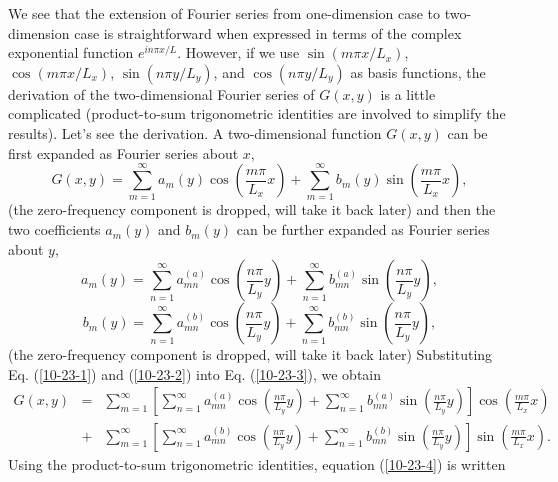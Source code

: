 \documentclass{article}
\begin{document}
We see that the extension of Fourier series from one-dimension case to
two-dimension case is straightforward when expressed in terms of the complex
exponential function $e^{i n \pi x / L}$. However, if we use $\sin (m \pi x /
L_x)$, $\cos (m \pi x / L_x)$, $\sin (n \pi y / L_y)$, and $\cos (n \pi y /
L_y)$ as basis functions, the derivation of the two-dimensional Fourier series
of $G (x, y)$ is a little complicated (product-to-sum trigonometric identities
are involved to simplify the results). Let's see the derivation. A
two-dimensional function $G (x, y)$ can be first expanded as Fourier series
about $x$,
\begin{equation}
  \label{10-23-3} G (x, y) = \sum_{m = 1}^{\infty} a_m (y) \cos \left( \frac{m
  \pi}{L_x} x \right) + \sum_{m = 1}^{\infty} b_m (y) \sin \left( \frac{m
  \pi}{L_x} x \right),
\end{equation}
(the zero-frequency component is dropped, will take it back later) and then
the two coefficients $a_m (y)$ and $b_m (y)$ can be further expanded as
Fourier series about $y$,
\begin{equation}
  \label{10-23-1} a_m (y) = \sum_{n = 1}^{\infty} a_{m n}^{(a)} \cos \left(
  \frac{n \pi}{L_y} y \right) + \sum_{n = 1}^{\infty} b_{m n}^{(a)} \sin
  \left( \frac{n \pi}{L_y} y \right),
\end{equation}
\begin{equation}
  \label{10-23-2} b_m (y) = \sum_{n = 1}^{\infty} a_{m n}^{(b)} \cos \left(
  \frac{n \pi}{L_y} y \right) + \sum_{n = 1}^{\infty} b_{m n}^{(b)} \sin
  \left( \frac{n \pi}{L_y} y \right),
\end{equation}
(the zero-frequency component is dropped, will take it back later)
Substituting Eq. (\ref{10-23-1}) and (\ref{10-23-2}) into Eq. (\ref{10-23-3}),
we obtain
\begin{eqnarray}
  G (x, y) & = & \sum_{m = 1}^{\infty} \left[ \sum_{n = 1}^{\infty} a_{m
  n}^{(a)} \cos \left( \frac{n \pi}{L_y} y \right) + \sum_{n = 1}^{\infty}
  b_{m n}^{(a)} \sin \left( \frac{n \pi}{L_y} y \right) \right] \cos \left(
  \frac{m \pi}{L_x} x \right) \nonumber\\
  & + & \sum_{m = 1}^{\infty} \left[ \sum_{n = 1}^{\infty} a_{m n}^{(b)} \cos
  \left( \frac{n \pi}{L_y} y \right) + \sum_{n = 1}^{\infty} b_{m n}^{(b)}
  \sin \left( \frac{n \pi}{L_y} y \right) \right] \sin \left( \frac{m
  \pi}{L_x} x \right) .  \label{10-23-4}
\end{eqnarray}
Using the product-to-sum trigonometric identities, equation (\ref{10-23-4}) is
written
\end{document}
